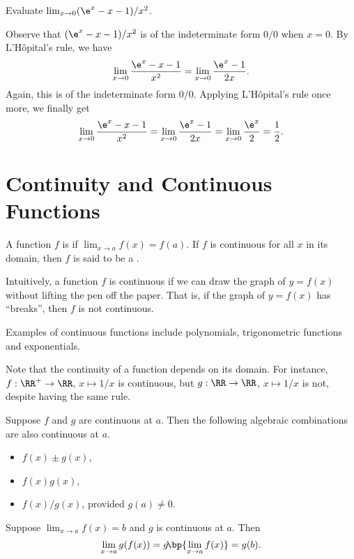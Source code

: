 \begin{sample}
    Evaluate $\lim_{x \to 0} (\e^x - x - 1)/x^2$.
\end{sample}
\begin{sampans}
    Observe that $(\e^x - x - 1)/x^2$ is of the indeterminate form $0/0$ when $x = 0$. By L'H\^{o}pital's rule, we have \[\lim_{x \to 0} \frac{\e^x - x - 1}{x^2} = \lim_{x \to 0} \frac{\e^x - 1}{2x}.\] Again, this is of the indeterminate form $0/0$. Applying L'H\^{o}pital's rule once more, we finally get \[\lim_{x \to 0} \frac{\e^x - x - 1}{x^2} = \lim_{x \to 0} \frac{\e^x - 1}{2x} = \lim_{x \to 0} \frac{\e^x}{2} = \frac12.\]
\end{sampans}

\section{Continuity and Continuous Functions}

\begin{definition}
    A function $f$ is  if $\lim_{x \to a} f(x) = f(a)$. If $f$ is continuous for all $x$ in its domain, then $f$ is said to be a .
\end{definition}

Intuitively, a function $f$ is continuous if we can draw the graph of $y = f(x)$ without lifting the pen off the paper. That is, if the graph of $y = f(x)$ has ``breaks'', then $f$ is not continuous.

Examples of continuous functions include polynomials, trigonometric functions and exponentials.

Note that the continuity of a function depends on its domain. For instance, $f : \RR^+ \to \RR$, $x \mapsto 1/x$ is continuous, but $g : \RR \to \RR$, $x \mapsto 1/x$ is not, despite having the same rule.

\begin{fact}
    Suppose $f$ and $g$ are continuous at $a$. Then the following algebraic combinations are also continuous at $a$.
    \begin{itemize}
        \item $f(x) \pm g(x)$,
        \item $f(x) g(x)$,
        \item $f(x)/g(x)$, provided $g(a) \neq 0$.
    \end{itemize}
\end{fact}

\begin{proposition}
    Suppose $\lim_{x \to a} f(x) = b$ and $g$ is continuous at $a$. Then \[\lim_{x \to a} g(f(x)) = g\!\bp{\lim_{x \to a} f(x)} = g(b).\]
\end{proposition}

